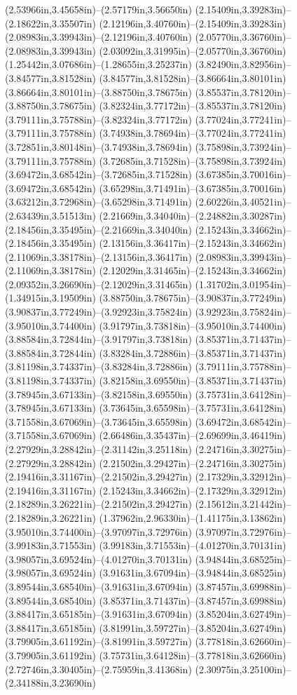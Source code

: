 (2.53966in,3.45658in)--(2.57179in,3.56650in) (2.15409in,3.39283in)--(2.18622in,3.35507in) (2.12196in,3.40760in)--(2.15409in,3.39283in) (2.08983in,3.39943in)--(2.12196in,3.40760in) (2.05770in,3.36760in)--(2.08983in,3.39943in) (2.03092in,3.31995in)--(2.05770in,3.36760in) (1.25442in,3.07686in)--(1.28655in,3.25237in) (3.82490in,3.82956in)--(3.84577in,3.81528in) (3.84577in,3.81528in)--(3.86664in,3.80101in) (3.86664in,3.80101in)--(3.88750in,3.78675in) (3.85537in,3.78120in)--(3.88750in,3.78675in) (3.82324in,3.77172in)--(3.85537in,3.78120in) (3.79111in,3.75788in)--(3.82324in,3.77172in) (3.77024in,3.77241in)--(3.79111in,3.75788in) (3.74938in,3.78694in)--(3.77024in,3.77241in) (3.72851in,3.80148in)--(3.74938in,3.78694in) (3.75898in,3.73924in)--(3.79111in,3.75788in) (3.72685in,3.71528in)--(3.75898in,3.73924in) (3.69472in,3.68542in)--(3.72685in,3.71528in) (3.67385in,3.70016in)--(3.69472in,3.68542in) (3.65298in,3.71491in)--(3.67385in,3.70016in) (3.63212in,3.72968in)--(3.65298in,3.71491in) (2.60226in,3.40521in)--(2.63439in,3.51513in) (2.21669in,3.34040in)--(2.24882in,3.30287in) (2.18456in,3.35495in)--(2.21669in,3.34040in) (2.15243in,3.34662in)--(2.18456in,3.35495in) (2.13156in,3.36417in)--(2.15243in,3.34662in) (2.11069in,3.38178in)--(2.13156in,3.36417in) (2.08983in,3.39943in)--(2.11069in,3.38178in) (2.12029in,3.31465in)--(2.15243in,3.34662in) (2.09352in,3.26690in)--(2.12029in,3.31465in) (1.31702in,3.01954in)--(1.34915in,3.19509in) (3.88750in,3.78675in)--(3.90837in,3.77249in) (3.90837in,3.77249in)--(3.92923in,3.75824in) (3.92923in,3.75824in)--(3.95010in,3.74400in) (3.91797in,3.73818in)--(3.95010in,3.74400in) (3.88584in,3.72844in)--(3.91797in,3.73818in) (3.85371in,3.71437in)--(3.88584in,3.72844in) (3.83284in,3.72886in)--(3.85371in,3.71437in) (3.81198in,3.74337in)--(3.83284in,3.72886in) (3.79111in,3.75788in)--(3.81198in,3.74337in) (3.82158in,3.69550in)--(3.85371in,3.71437in) (3.78945in,3.67133in)--(3.82158in,3.69550in) (3.75731in,3.64128in)--(3.78945in,3.67133in) (3.73645in,3.65598in)--(3.75731in,3.64128in) (3.71558in,3.67069in)--(3.73645in,3.65598in) (3.69472in,3.68542in)--(3.71558in,3.67069in) (2.66486in,3.35437in)--(2.69699in,3.46419in) (2.27929in,3.28842in)--(2.31142in,3.25118in) (2.24716in,3.30275in)--(2.27929in,3.28842in) (2.21502in,3.29427in)--(2.24716in,3.30275in) (2.19416in,3.31167in)--(2.21502in,3.29427in) (2.17329in,3.32912in)--(2.19416in,3.31167in) (2.15243in,3.34662in)--(2.17329in,3.32912in) (2.18289in,3.26221in)--(2.21502in,3.29427in) (2.15612in,3.21442in)--(2.18289in,3.26221in) (1.37962in,2.96330in)--(1.41175in,3.13862in) (3.95010in,3.74400in)--(3.97097in,3.72976in) (3.97097in,3.72976in)--(3.99183in,3.71553in) (3.99183in,3.71553in)--(4.01270in,3.70131in) (3.98057in,3.69524in)--(4.01270in,3.70131in) (3.94844in,3.68525in)--(3.98057in,3.69524in) (3.91631in,3.67094in)--(3.94844in,3.68525in) (3.89544in,3.68540in)--(3.91631in,3.67094in) (3.87457in,3.69988in)--(3.89544in,3.68540in) (3.85371in,3.71437in)--(3.87457in,3.69988in) (3.88417in,3.65185in)--(3.91631in,3.67094in) (3.85204in,3.62749in)--(3.88417in,3.65185in) (3.81991in,3.59727in)--(3.85204in,3.62749in) (3.79905in,3.61192in)--(3.81991in,3.59727in) (3.77818in,3.62660in)--(3.79905in,3.61192in) (3.75731in,3.64128in)--(3.77818in,3.62660in) (2.72746in,3.30405in)--(2.75959in,3.41368in) (2.30975in,3.25100in)--(2.34188in,3.23690in) 